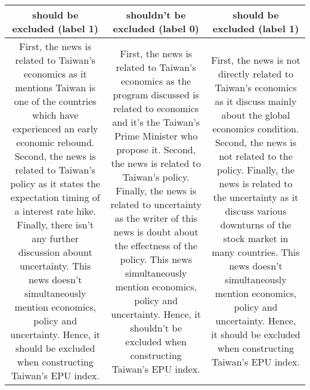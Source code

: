 {
\def\sym#1{\ifmmode^{#1}\else\(^{#1}\)\fi}
\begin{tabularx}{\textwidth}{|C|C|C|}
\hline

\textbf{should be excluded (label 1)} & 
\textbf{shouldn't be excluded (label 0)} & 
\textbf{should be excluded (label 1)}\\
\hline
First, the news is related to Taiwan's economics as it mentions Taiwan is one of the countries which have experienced an early economic rebound. Second, the news is related to Taiwan's policy as it states the expectation timing of a interest rate hike. Finally, there isn't any further discussion abount uncertainty. This news doesn't simultaneously mention economics, policy and uncertainty. Hence, it should be excluded when constructing Taiwan's EPU index.
&
First, the news is related to Taiwan's economics as the program discussed is related to economics and it's the Taiwan's Prime Minister who propose it. Second, the news is related to Taiwan's policy. Finally, the news is related to uncertainty as the writer of this news is doubt about the effectness of the policy. This news simultaneously mention economics, policy and uncertainty. Hence, it shouldn't be excluded when constructing Taiwan's EPU index.
&
First, the news is not directly related to Taiwan's economics as it discuss mainly about the global economics condition. Second, the news is not related to the policy. Finally, the news is related to the uncertainty as it discuss various downturns of the stock market in many countries. This news doesn't simultaneously mention economics, policy and uncertainty. Hence, it should be excluded when constructing Taiwan's EPU index.
\\
\hline


\end{tabularx}}
